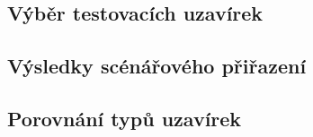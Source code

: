 
\subsection{Výběr testovacích uzavírek}

\subsection{Výsledky scénářového přiřazení}
%
%
%

\subsection{Porovnání typů uzavírek}

